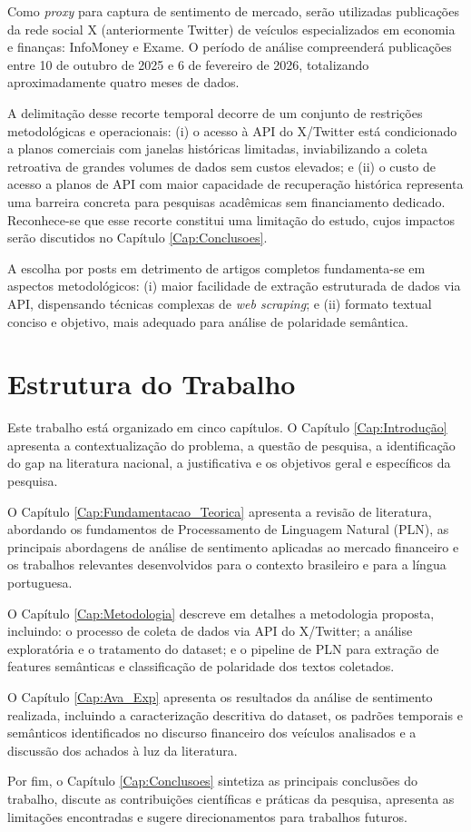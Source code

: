 Como \textit{proxy} para captura de sentimento de mercado, serão utilizadas publicações da rede social X (anteriormente Twitter) de veículos especializados em economia e finanças: InfoMoney e Exame. O período de análise compreenderá publicações entre 10 de outubro de 2025 e 6 de fevereiro de 2026, totalizando aproximadamente quatro meses de dados.

A delimitação desse recorte temporal decorre de um conjunto de restrições metodológicas e operacionais: (i) o acesso à API do X/Twitter está condicionado a planos comerciais com janelas históricas limitadas, inviabilizando a coleta retroativa de grandes volumes de dados sem custos elevados; e (ii) o custo de acesso a planos de API com maior capacidade de recuperação histórica representa uma barreira concreta para pesquisas acadêmicas sem financiamento dedicado. Reconhece-se que esse recorte constitui uma limitação do estudo, cujos impactos serão discutidos no Capítulo \ref{Cap:Conclusoes}.

A escolha por posts em detrimento de artigos completos fundamenta-se em aspectos metodológicos: (i) maior facilidade de extração estruturada de dados via API, 
dispensando técnicas complexas de \textit{web scraping}; e (ii) formato textual conciso e objetivo, mais adequado para análise de polaridade semântica.


\section{Estrutura do Trabalho}

Este trabalho está organizado em cinco capítulos. O Capítulo \ref{Cap:Introdução} apresenta a contextualização do problema, a questão de pesquisa, a identificação do gap na literatura nacional, a justificativa e os objetivos geral e específicos da pesquisa.

O Capítulo \ref{Cap:Fundamentacao_Teorica} apresenta a revisão de literatura, abordando os fundamentos de Processamento de Linguagem Natural (PLN), as principais abordagens de análise de sentimento aplicadas ao mercado financeiro e os trabalhos relevantes desenvolvidos para o contexto brasileiro e para a língua portuguesa.

O Capítulo \ref{Cap:Metodologia} descreve em detalhes a metodologia proposta, incluindo: o processo de coleta de dados via API do X/Twitter; a análise exploratória e o tratamento do dataset; e o pipeline de PLN para extração de features semânticas e classificação de polaridade dos textos coletados.

O Capítulo \ref{Cap:Ava_Exp} apresenta os resultados da análise de sentimento realizada, incluindo a caracterização descritiva do dataset, os padrões temporais e semânticos identificados no discurso financeiro dos veículos analisados e a discussão dos achados à luz da literatura.

Por fim, o Capítulo \ref{Cap:Conclusoes} sintetiza as principais conclusões do trabalho, discute as contribuições científicas e práticas da pesquisa, apresenta as limitações encontradas e sugere direcionamentos para trabalhos futuros.